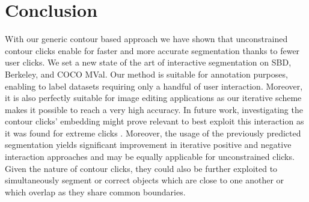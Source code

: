 \documentclass[letterpaper, 10 pt, conference]{ieeeconf}
\begin{document}
\section{Conclusion}

With our generic contour based approach we have shown that unconstrained contour clicks enable for faster and more accurate segmentation thanks to fewer user clicks. We set a new state of the art of interactive segmentation on SBD, Berkeley, and COCO MVal. Our method is suitable for annotation purposes, enabling to label datasets requiring only a handful of user interaction. Moreover, it is also perfectly suitable for image editing applications as our iterative scheme makes it possible to reach a very high accuracy. In future work, investigating the contour clicks' embedding might prove relevant to best exploit this interaction as it was found for extreme clicks \cite{wang19}. Moreover, the usage of the previously predicted segmentation yields significant improvement in iterative positive and negative interaction approaches \cite{benard18,forte20} and may be equally applicable for unconstrained clicks. Given the nature of contour clicks, they could also be further exploited to simultaneously segment or correct objects which are close to one another or which overlap as they share common boundaries.









{\small


}
\end{document}
